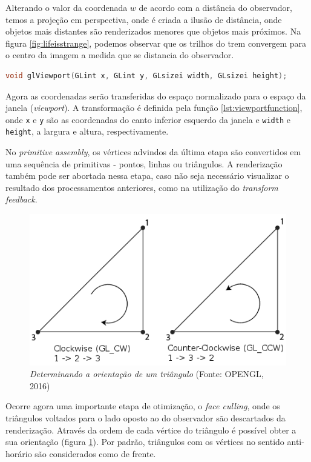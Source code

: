 Alterando o valor da coordenada $w$ de acordo com a distância do observador, temos a projeção em perspectiva, onde é criada a ilusão de distância, onde objetos mais distantes são renderizados menores que objetos mais próximos. Na figura \ref{fig:lifeisstrange}, podemos observar que os trilhos do trem convergem para o centro da imagem a medida que se distancia do observador.

\begin{lstlisting}[language=c,
label={lst:viewportfunction},
caption="Função glViewport"]
	void glViewport(GLint x, GLint y, GLsizei width, GLsizei height);
\end{lstlisting}

Agora as coordenadas serão transferidas do espaço normalizado para o espaço da janela (\textit{viewport}). A transformação é definida pela função \ref{lst:viewportfunction}, onde \lstinline{x} e \lstinline{y} são as coordenadas do canto inferior esquerdo da janela e \lstinline{width} e \lstinline{height}, a largura e altura, respectivamente.

No \textit{primitive assembly}, os vértices advindos da última etapa são convertidos em uma sequência de primitivas - pontos, linhas ou triângulos. A renderização também pode ser abortada nessa etapa, caso não seja necessário visualizar o resultado dos processamentos anteriores, como na utilização do \textit{transform feedback}.

\begin{figure}[H]
	\centering
	\includegraphics[scale=0.6]{imagens/triangle-winding.png}
	\caption{\small \textit{Determinando a orientação de um triângulo} (Fonte: OPENGL, 2016)}
	\label{fig:trianglewinding}
\end{figure}

Ocorre agora uma importante etapa de otimização, o \textit{face culling}, onde os triângulos voltados para o lado oposto ao do observador são descartados da renderização. Através da ordem de cada vértice do triângulo é possível obter a sua orientação (figura \ref{fig:trianglewinding}). Por padrão, triângulos com os vértices no sentido anti-horário são considerados como de frente.

